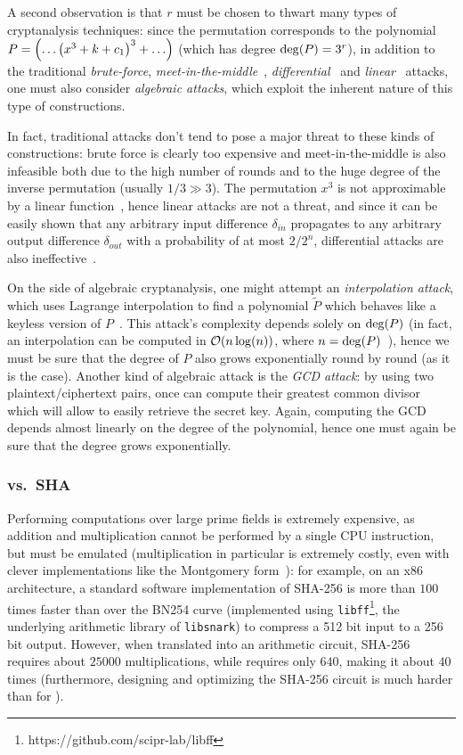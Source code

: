 A second observation is that \(r\) must be chosen to thwart many types of cryptanalysis 
techniques: since the \Mimc{} permutation corresponds to the 
polynomial \(P = \Parens*{\dots\Parens*{x^3 + k + c_1}^3 + \dots}\) 
(which has degree \(\call{\deg}{P} = 3^r\)), in addition to the traditional \emph{brute-force}, 
\emph{meet-in-the-middle}~\cite{DiffieH1977}, \emph{differential}~\cite{BihamS1991} and 
\emph{linear}~\cite{Matsui1994} attacks, one must also consider \emph{algebraic attacks}, 
which exploit the inherent nature of this type of constructions.

In fact, traditional attacks don't tend to pose a major threat to these kinds of constructions:
brute force is clearly too expensive and meet-in-the-middle is also infeasible both due to the high 
number of rounds and to the huge degree of the inverse permutation (usually \(1/3 \gg 3\)).
The permutation \(x^3\) is not approximable by a linear function~\cite{AbdelraheemABL2012}, 
hence linear attacks are not a threat, and since it can be easily shown that any arbitrary input 
difference \(\delta_{in} \) propagates to any arbitrary output difference \(\delta_{out} \) with a 
probability of at most \({2}/{2^n}\), differential attacks are also ineffective~\cite{Nyberg1994}.

On the side of algebraic cryptanalysis, one might attempt an \emph{interpolation attack}, which 
uses Lagrange interpolation to find a polynomial \(\tilde{P}\) which behaves like a keyless version 
of \(P\)~\cite{JakobsenK1997}.
This attack's complexity depends solely on \(\call{\deg}{P}\) (in fact, an interpolation can be 
computed in \(\BigO{n\call{\log}{n}}\), where \(n = \call{\deg}{P}\)~\cite{Stoss1985}), hence we 
must be sure that the degree of \(P\) also grows exponentially round by round (as it is the case).
Another kind of algebraic attack is the \emph{GCD attack}: by using two plaintext/ciphertext pairs,
once can compute their greatest common divisor which will allow to easily retrieve the secret key.
Again, computing the GCD depends almost linearly on the degree of the polynomial, hence one must 
again be sure that the degree grows exponentially.

\subsubsection*{\Mimc{} vs.\ SHA}
Performing computations over large prime fields is extremely expensive, as addition and 
multiplication cannot be performed by a single CPU instruction, but must be emulated (multiplication 
in particular is extremely costly, even with clever implementations like the Montgomery 
form~\cite{Montgomery1985}): for example, on an x86 architecture, a standard software 
implementation of SHA-256 is more than \(100\) times faster than \Mimc{} over the BN254 curve 
(implemented using \texttt{libff}\footnote{https://github.com/scipr-lab/libff}, the underlying 
arithmetic library of \texttt{libsnark}) to compress a 512 bit input to a 256 bit output.
However, when translated into an arithmetic circuit, SHA-256 requires about \(25000\) 
multiplications, while \Mimc{} requires only \(640\), making it about \(40\) times (furthermore, 
designing and optimizing the SHA-256 circuit is much harder than for \Mimc{}). 

